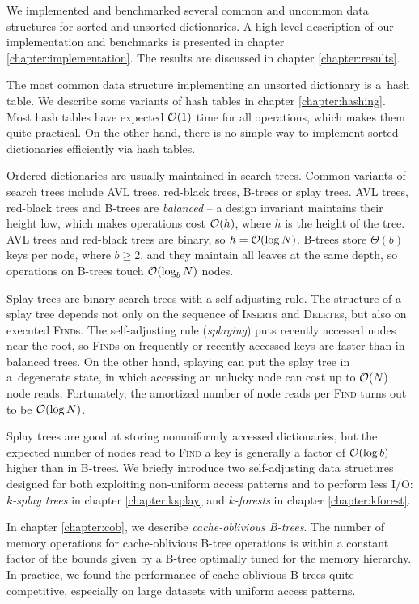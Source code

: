 We implemented and benchmarked several common and uncommon data structures
for sorted and unsorted dictionaries. A high-level description of our
implementation and benchmarks is presented in chapter
\ref{chapter:implementation}. The results are discussed in
chapter \ref{chapter:results}.

The most common data structure implementing an unsorted dictionary is a~hash
table. We describe some variants of hash tables in chapter \ref{chapter:hashing}.
Most hash tables have expected $\mathcal{O}(1)$ time for all operations, which
makes them quite practical. On the other hand, there is no simple way to
implement sorted dictionaries efficiently via hash tables.

Ordered dictionaries are usually maintained in search trees. Common variants
of search trees include AVL trees, red-black trees, B-trees or splay trees.
AVL trees, red-black trees and B-trees are \emph{balanced} -- a design
invariant maintains their height low, which makes operations cost $\mathcal{O}(h)$, where
$h$ is the height of the tree. AVL trees and red-black trees are binary,
so $h=\mathcal{O}(\log N)$. B-trees store $\Theta(b)$ keys per node, where $b\geq 2$,
and they maintain all leaves at the same depth, so operations on B-trees touch
$\mathcal{O}(\log_b N)$ nodes.

Splay trees are binary search trees with a self-adjusting rule.
The structure of a splay tree depends not only on the sequence of
\textsc{Insert}s and \textsc{Delete}s, but also on executed \textsc{Find}s.
The self-adjusting rule (\emph{splaying}) puts recently accessed nodes
near the root, so \textsc{Find}s on frequently or recently accessed keys
are faster than in balanced trees. On the other hand, splaying can put
the splay tree in a~degenerate state, in which accessing an unlucky node can
cost up to $\mathcal{O}(N)$ node reads. Fortunately, the amortized number of node
reads per \textsc{Find} turns out to be $\mathcal{O}(\log N)$.

Splay trees are good at storing nonuniformly accessed dictionaries, but
the expected number of nodes read to \textsc{Find} a key is generally a factor
of $\mathcal{O}(\log b)$ higher than in B-trees. We briefly introduce two
self-adjusting data structures designed for both exploiting non-uniform
access patterns and to perform less I/O: \emph{$k$-splay trees} in chapter
\ref{chapter:ksplay} and \emph{$k$-forests} in chapter \ref{chapter:kforest}.

In chapter \ref{chapter:cob}, we describe \emph{cache-oblivious B-trees}.
The number of memory operations for cache-oblivious B-tree operations
is within a constant factor of the bounds given by a B-tree optimally tuned
for the memory hierarchy. In practice, we found the performance of
cache-oblivious B-trees quite competitive, especially on large datasets
with uniform access patterns.

